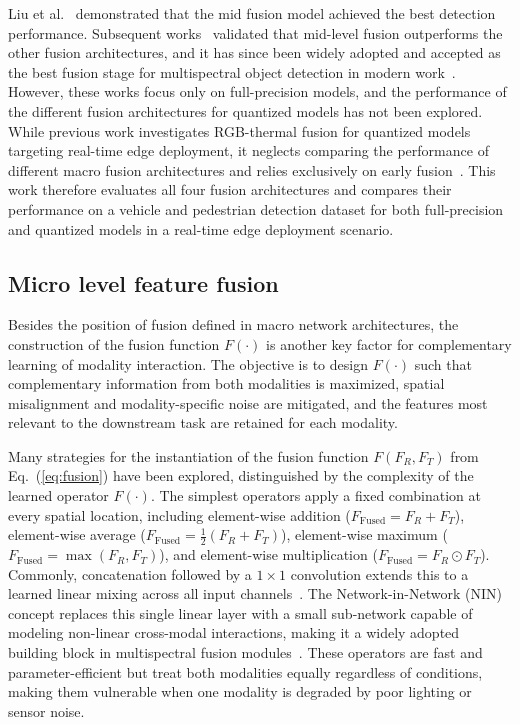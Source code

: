 \documentclass[12pt,oneside,bibtotoc,liststotoc]{scrbook}
\begin{document}
Liu et al.~\cite{liu2016multispectralDeepNeuralNetworks} demonstrated that the mid fusion model
achieved the best detection performance. Subsequent
works~\cite{li2019illuminationAwareFasterRCNN, zhang2019crossModalityInteractiveAttentionNetwork}
validated that mid-level fusion outperforms the other fusion architectures,
and it has since been widely adopted and accepted as the best fusion stage for
multispectral object detection in modern
work~\cite{zhang2021GAFF,qingyun2021CFT, gallagher2025surveyMultispectralYOLO, wan2025yolov11rgbt}.
However, these works focus only on full-precision models, and the performance
of the different fusion architectures for quantized models has not been explored.
While previous work investigates RGB-thermal fusion for quantized models targeting
real-time edge deployment, it neglects comparing the performance of different macro
fusion architectures and relies exclusively on early
fusion~\cite{kafka2025EarlyFusionQuantizedModels}.
This work therefore evaluates all four fusion architectures and compares their
performance on a vehicle and pedestrian detection dataset for both full-precision
and quantized models in a real-time edge deployment scenario.

\vspace{-1em}
\subsection{Micro level feature fusion}
\label{sec:micro_fusion}

Besides the position of fusion defined in macro network architectures, the
construction of the fusion function $F(\cdot)$ is another key factor for
complementary learning of modality interaction.
The objective is to design $F(\cdot)$ such that complementary information
from both modalities is maximized, spatial misalignment and
modality-specific noise are mitigated, and the features most relevant
to the downstream task are retained for each modality.

Many strategies for the instantiation of the fusion function
$F(F_R, F_T)$ from Eq.~(\ref{eq:fusion}) have been explored, distinguished by the complexity of the learned operator $F(\cdot)$.
The simplest operators apply a fixed combination at every spatial location, including element-wise addition ($F_{\text{Fused}} = F_R + F_T$),
element-wise average ($F_{\text{Fused}} = \frac{1}{2}(F_R + F_T)$), element-wise maximum ($F_{\text{Fused}} = \max(F_R, F_T)$),
and element-wise multiplication ($F_{\text{Fused}} = F_R \odot F_T$).
Commonly, concatenation followed by a $1{\times}1$ convolution extends this to a learned linear mixing across
all input channels~\cite{liu2016multispectralDeepNeuralNetworks}.
The Network-in-Network (NIN)~\cite{lin2013networkInNetwork} concept replaces this single linear layer with a
small sub-network capable of modeling non-linear cross-modal interactions,
making it a widely adopted building block in multispectral fusion
modules~\cite{zhang2019crossModalityInteractiveAttentionNetwork, zhang2021GAFF, liang2023explicitAttentionEnhancedFusion, qingyun2021CFT}.
These operators are fast and parameter-efficient but treat both modalities equally regardless
of conditions, making them vulnerable when one modality is degraded by poor lighting or sensor noise.
\end{document}
